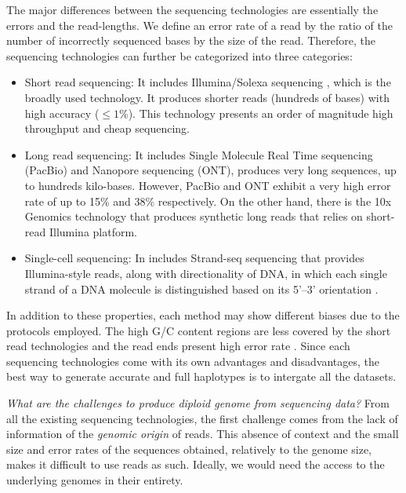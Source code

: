The major differences between the sequencing technologies are essentially the errors and the read-lengths. We define an error rate of a read by the ratio of the number of incorrectly sequenced bases by the size of the read.
Therefore, the sequencing technologies can further be categorized into three categories:
\begin{itemize}
 \item Short read sequencing: It includes Illumina/Solexa sequencing \citep{bentley2008accurate}, which is the broadly used technology. 
 It produces shorter reads (hundreds of bases) with high accuracy ($\le 1$\%). 
 This technology presents an order of magnitude high throughput and cheap sequencing.
  \item Long read sequencing: It includes Single Molecule Real Time sequencing (PacBio) \citep{eid2009real} and Nanopore sequencing (ONT)\citep{laszlo2014decoding}, produces very long sequences, up to hundreds kilo-bases. 
  However, PacBio and ONT exhibit a very high error rate of up to 15\% and 38\% respectively. On the other hand, there is the 10x Genomics technology \citep{eisenstein2015startups} that produces synthetic long reads that relies on short-read Illumina platform.
 \item Single-cell sequencing: In includes Strand-seq sequencing that provides Illumina-style reads, along with directionality of DNA, in which each single strand of a DNA molecule is distinguished based on its 5'–3' orientation \citep{falconer2012dna}.
\end{itemize}

In addition to these properties, each method may show different biases due to the protocols employed.
The high G/C content regions are less covered by the short read technologies and the read ends present high error rate \citep{aird2011analyzing, dohm2008substantial}.
Since each sequencing technologies come with its own advantages and disadvantages, the best way to generate accurate and full haplotypes is to intergate all the datasets.

\textit{What are the challenges to produce diploid genome from sequencing data?}
From all the existing sequencing technologies, the first challenge comes from the lack of information of the \textit{genomic origin} of reads.
This absence of context and the small size and error rates of the sequences obtained, relatively to the genome size, makes it difficult to use reads as such.
Ideally, we would need the access to the underlying genomes in their entirety.

